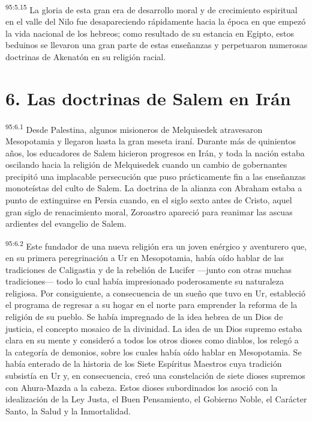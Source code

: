 \par
\textsuperscript{95:5.15} La gloria de esta gran era de desarrollo moral y de crecimiento espiritual en el valle del Nilo fue desapareciendo rápidamente hacia la época en que empezó la vida nacional de los hebreos; como resultado de su estancia en Egipto, estos beduinos se llevaron una gran parte de estas enseñanzas y perpetuaron numerosas doctrinas de Akenatón en su religión racial.

\section*{6. Las doctrinas de Salem en Irán}
\par
\textsuperscript{95:6.1} Desde Palestina, algunos misioneros de Melquisedek atravesaron Mesopotamia y llegaron hasta la gran meseta iraní. Durante más de quinientos años, los educadores de Salem hicieron progresos en Irán, y toda la nación estaba oscilando hacia la religión de Melquisedek cuando un cambio de gobernantes precipitó una implacable persecución que puso prácticamente fin a las enseñanzas monoteístas del culto de Salem. La doctrina de la alianza con Abraham estaba a punto de extinguirse en Persia cuando, en el siglo sexto antes de Cristo, aquel gran siglo de renacimiento moral, Zoroastro apareció para reanimar las ascuas ardientes del evangelio de Salem.

\par
\textsuperscript{95:6.2} Este fundador de una nueva religión era un joven enérgico y aventurero que, en su primera peregrinación a Ur en Mesopotamia, había oído hablar de las tradiciones de Caligastia y de la rebelión de Lucifer ---junto con otras muchas tradiciones--- todo lo cual había impresionado poderosamente su naturaleza religiosa. Por consiguiente, a consecuencia de un sueño que tuvo en Ur, estableció el programa de regresar a su hogar en el norte para emprender la reforma de la religión de su pueblo. Se había impregnado de la idea hebrea de un Dios de justicia, el concepto mosaico de la divinidad. La idea de un Dios supremo estaba clara en su mente y consideró a todos los otros dioses como diablos, los relegó a la categoría de demonios, sobre los cuales había oído hablar en Mesopotamia. Se había enterado de la historia de los Siete Espíritus Maestros cuya tradición subsistía en Ur y, en consecuencia, creó una constelación de siete dioses supremos con Ahura-Mazda a la cabeza. Estos dioses subordinados los asoció con la idealización de la Ley Justa, el Buen Pensamiento, el Gobierno Noble, el Carácter Santo, la Salud y la Inmortalidad.

